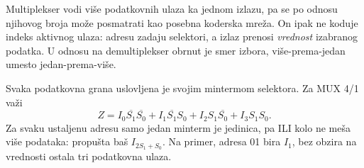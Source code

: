 
Multiplekser vodi više podatkovnih ulaza ka jednom izlazu, pa se po odnosu njihovog broja može posmatrati kao posebna koderska mreža. On ipak ne koduje indeks aktivnog ulaza: adresu zadaju selektori, a izlaz prenosi \emph{vrednost} izabranog podatka. U odnosu na demultiplekser obrnut je smer izbora, više-prema-jedan umesto jedan-prema-više.

Svaka podatkovna grana uslovljena je svojim mintermom selektora. Za MUX 4/1 važi
\[
 Z=I_0\overline{S_1}\overline{S_0}
  +I_1\overline{S_1}S_0
  +I_2S_1\overline{S_0}+I_3S_1S_0.
\]
Za svaku ustaljenu adresu samo jedan minterm je jedinica, pa ILI kolo ne meša više podataka: propušta baš \(I_{2S_1+S_0}\). Na primer, adresa 01 bira \(I_1\), bez obzira na vrednosti ostala tri podatkovna ulaza.
